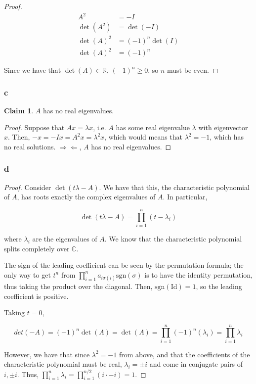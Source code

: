 \documentclass[12pt,letterpaper]{article}
\theoremstyle{definition}
\newtheorem*{claim}{Claim}
\newcommand{\contra}{\Rightarrow\!\Leftarrow}
\newcommand{\R}{\mathbb{R}}
\newcommand{\C}{\mathbb{C}}
\newcommand{\id}{\mathrm{Id}}
\begin{document}
\begin{proof}
  \begin{align*}
    A^2 &= -I \\
    \det(A^2) &= \det(-I) \\
    \det(A)^2 &= (-1)^n\det(I) \\
    \det(A)^2 &= (-1)^n
  \end{align*}

  Since we have that $\det(A) \in \R$, $(-1)^n \geq 0$, so $n$ must be even.
\end{proof}

\subsubsection*{c}

\begin{claim}
  $A$ has no real eigenvalues.
\end{claim}

\begin{proof}
  Suppose that $Ax = \lambda x$, i.e. $A$ has some real eigenvalue $\lambda$
  with eigenvector $x$. Then, $-x = -Ix = A^2x = \lambda^2 x$, which would means
  that $\lambda^2 = -1$, which has no real solutions. $\contra$, $A$ has no real eigenvalues.
\end{proof}

\subsubsection*{d}

\begin{proof}
  Consider $\det(t\lambda - A)$. We have that this, the characteristic
  polynomial of $A$, has roots exactly the complex eigenvalues of $A$. In
  particular,

  \[
    \det(t\lambda - A) = \prod_{i=1}^n(t - \lambda_i)
  \]

  where $\lambda_i$ are the eigenvalues of $A$. We know that the characteristic
  polynomial splits completely over $\C$.

  The sign of the leading coefficient
  can be seen by the permutation formula; the only way to get $t^n$ from
  $\prod_{i=1}^na_{i\sigma(i)}\text{sgn}(\sigma)$ is to have the identity
  permutation, thus taking the product over the diagonal. Then,
  $\text{sgn}(\id) = 1$, so the leading coefficient is positive.

  Taking $t = 0$,

  \[
    det(-A) = (-1)^n\det(A) = \det(A) = \prod_{i=1}^n (-1)^n(\lambda_i) = \prod_{i=1}^n \lambda_i
  \]

  However, we have that since $\lambda^2 = -1$ from above, and that the
  coefficients of the characteristic polynomial must be real, $\lambda_i = \pm
  i$ and come in conjugate pairs of $i, \pm i$. Thus, $\prod_{i=1}^n \lambda_i =
  \prod_{i=1}^{n/2}(i \cdot -i) = 1$.
\end{proof}
\end{document}
